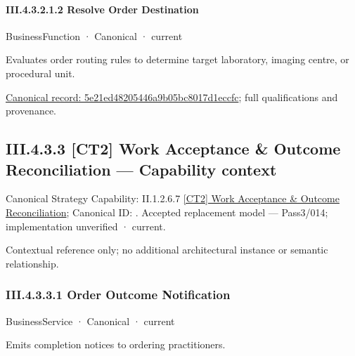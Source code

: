 \paragraph*{III.4.3.2.1.2 Resolve Order Destination}
\label{navigation:III.4.3.2.1.2}

\label{element:5e21ed48205446a9b05bc8017d1eccfc}
{\small BusinessFunction · Canonical · current}\par

Evaluates order routing rules to determine target laboratory, imaging centre, or procedural unit.


{\footnotesize \href{../../../../../../../../continuum/business/business-function/5e21ed48205446a9b05bc8017d1eccfc.md}{Canonical record: 5e21ed48205446a9b05bc8017d1eccfc}; full qualifications and provenance.}\par
\subsection*{III.4.3.3 [CT2] Work Acceptance \& Outcome Reconciliation — Capability context}
\label{navigation:III.4.3.3}

{\small Canonical Strategy Capability: II.1.2.6.7 \hyperref[element:64615db0fc2a4198a06d7e08cd0990c0]{[CT2] Work Acceptance \& Outcome Reconciliation}; Canonical ID: \texttt{}. Accepted replacement model — Pass3/014; implementation unverified · current.}\par
Contextual reference only; no additional architectural instance or semantic relationship.\par
\subsubsection*{III.4.3.3.1 Order Outcome Notification}
\label{navigation:III.4.3.3.1}

\label{element:1d961373ab484e5f887ecf4c7b166130}
{\small BusinessService · Canonical · current}\par

Emits completion notices to ordering practitioners.


